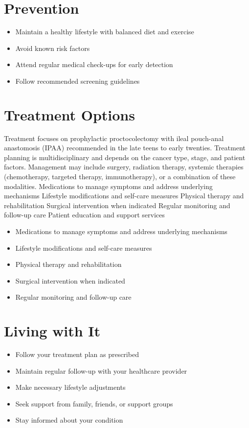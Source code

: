 \section{Prevention}
\begin{itemize}[noitemsep]
  \item Maintain a healthy lifestyle with balanced diet and exercise
  \item Avoid known risk factors
  \item Attend regular medical check-ups for early detection
  \item Follow recommended screening guidelines
\end{itemize}
\section{Treatment Options}
Treatment focuses on prophylactic proctocolectomy with ileal pouch-anal anastomosis (IPAA) recommended in the late teens to early twenties. Treatment planning is multidisciplinary and depends on the cancer type, stage, and patient factors. Management may include surgery, radiation therapy, systemic therapies (chemotherapy, targeted therapy, immunotherapy), or a combination of these modalities. Medications to manage symptoms and address underlying mechanisms Lifestyle modifications and self-care measures Physical therapy and rehabilitation Surgical intervention when indicated Regular monitoring and follow-up care Patient education and support services

\begin{itemize}[noitemsep]
  \item Medications to manage symptoms and address underlying mechanisms
  \item Lifestyle modifications and self-care measures
  \item Physical therapy and rehabilitation
  \item Surgical intervention when indicated
  \item Regular monitoring and follow-up care
\end{itemize}
\section{Living with It}
\begin{itemize}[noitemsep]
  \item Follow your treatment plan as prescribed
  \item Maintain regular follow-up with your healthcare provider
  \item Make necessary lifestyle adjustments
  \item Seek support from family, friends, or support groups
  \item Stay informed about your condition
\end{itemize}
